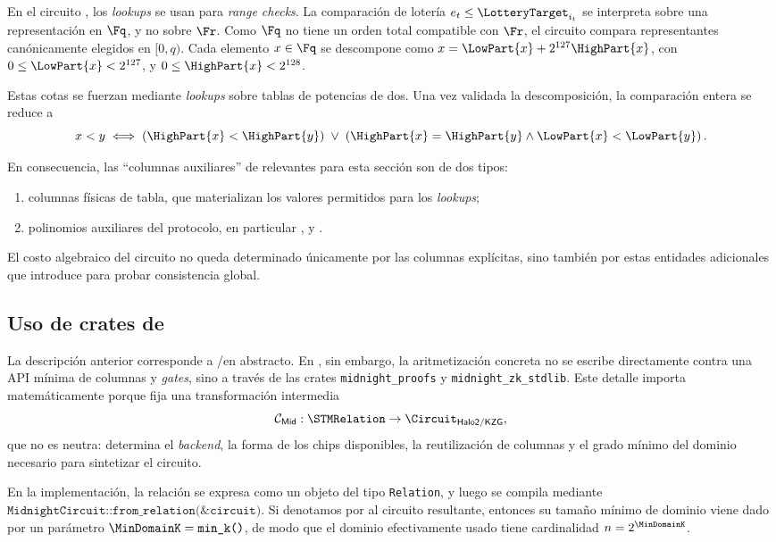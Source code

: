 En el circuito \STM, los \textit{lookups} se usan para \textit{range checks}. La comparación de lotería $e_t \le \LotteryTarget_{i_t}$ se interpreta sobre una representación en $\Fq$, y no sobre $\Fr$. Como $\Fq$ no tiene un orden total compatible con $\Fr$, el circuito compara representantes canónicamente elegidos en \([0,q)\). Cada elemento $x \in \Fq$ se descompone como $x = \LowPart{x} + 2^{127}\HighPart{x}$, con $0 \le \LowPart{x} < 2^{127}$, y $0 \le \HighPart{x} < 2^{128}$.

Estas cotas se fuerzan mediante \textit{lookups} sobre tablas de potencias de dos. Una vez validada la descomposición, la comparación entera se reduce a
$$x < y \iff \left(\HighPart{x} < \HighPart{y} \right) \;\vee\; \left(\HighPart{x} = \HighPart{y} \wedge \LowPart{x} < \LowPart{y}\right).$$

En consecuencia, las ``columnas auxiliares'' de \HaloTwo relevantes para esta sección son de dos tipos:
\begin{enumerate}[label=\arabic*), noitemsep]
    \item columnas físicas de tabla, que materializan los valores permitidos para los \textit{lookups};
    \item polinomios auxiliares del protocolo, en particular \PermutationPoly, \LookupPoly y \QuotientPoly.
\end{enumerate}
El costo algebraico del circuito no queda determinado únicamente por las columnas explícitas, sino también por estas entidades adicionales que \HaloTwo introduce para probar consistencia global.

\subsection{Uso de crates de \texorpdfstring{\textnormal{\Midnight}}{Midnight}}

La descripción anterior corresponde a \HaloTwo/\KZG en abstracto. En \Mithril, sin embargo, la aritmetización concreta no se escribe directamente contra una API mínima de columnas y \textit{gates}, sino a través de las crates \texttt{midnight\_proofs} y \texttt{midnight\_zk\_stdlib}. Este detalle importa matemáticamente porque fija una transformación intermedia
$$\mathcal{C}_{\mathsf{Mid}}: \STMRelation \to \Circuit_{\mathsf{Halo2/KZG}},$$
que no es neutra: determina el \textit{backend}, la forma de los chips disponibles, la reutilización de columnas y el grado mínimo del dominio necesario para sintetizar el circuito.

En la implementación, la relación \STM se expresa como un objeto del tipo \texttt{Relation}, y luego se compila mediante $\texttt{MidnightCircuit::from\_relation(\&circuit)}$. Si denotamos por \MidnightSTMCircuit al circuito resultante, entonces su tamaño mínimo de dominio viene dado por un parámetro $\MinDomainK = \texttt{min\_k()}$, de modo que el dominio \EvalDomain efectivamente usado tiene cardinalidad $n = 2^{\MinDomainK}$.


